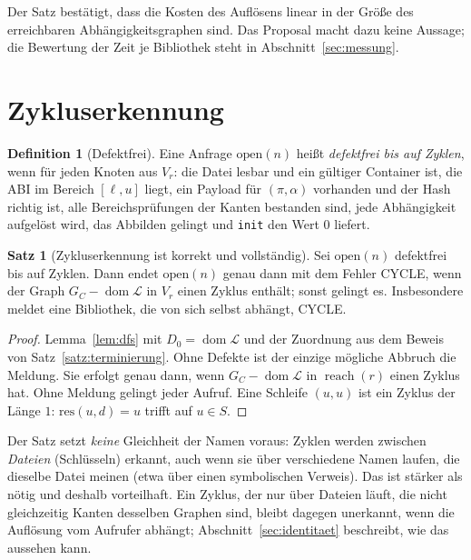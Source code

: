 \documentclass[a4paper,12pt,twoside]{report}
\DeclareRobustCommand{\_}{\ifmmode\mbox{\textunderscore}\else\textunderscore\allowbreak{}\fi}
\theoremstyle{definition}
\newtheorem{definition}{Definition}[chapter]
\newtheorem{satz}{Satz}[chapter]
\newcommand{\dom}{\operatorname{dom}}
\begin{document}
Der Satz bestätigt, dass die Kosten des Auflösens linear in der Größe des erreichbaren Abhängigkeitsgraphen sind. Das Proposal macht dazu keine Aussage; die Bewertung der Zeit je Bibliothek steht in Abschnitt~\ref{sec:messung}.

\section{Zykluserkennung}
\label{sec:zyklus}

\begin{definition}[Defektfrei]
	Eine Anfrage $\mathrm{open}(n)$ heißt \emph{defektfrei bis auf Zyklen}, wenn für jeden Knoten aus $V_r$: die Datei lesbar und ein gültiger Container ist, die ABI im Bereich $[\ell,u]$ liegt, ein Payload für $(\pi,\alpha)$ vorhanden und der Hash richtig ist, alle Bereichsprüfungen der Kanten bestanden sind, jede Abhängigkeit aufgelöst wird, das Abbilden gelingt und \texttt{init} den Wert $0$ liefert.
\end{definition}

\begin{satz}[Zykluserkennung ist korrekt und vollständig]
	\label{satz:zyklus}
	Sei $\mathrm{open}(n)$ defektfrei bis auf Zyklen. Dann endet $\mathrm{open}(n)$ genau dann mit dem Fehler CYCLE, wenn der Graph $G_C-\dom\mathcal L$ in $V_r$ einen Zyklus enthält; sonst gelingt es. Insbesondere meldet eine Bibliothek, die von sich selbst abhängt, CYCLE.
\end{satz}

\begin{proof}
	Lemma~\ref{lem:dfs} mit $D_0=\dom\mathcal L$ und der Zuordnung aus dem Beweis von Satz~\ref{satz:terminierung}. Ohne Defekte ist der einzige mögliche Abbruch die Meldung. Sie erfolgt genau dann, wenn $G_C-\dom\mathcal L$ in $\operatorname{reach}(r)$ einen Zyklus hat. Ohne Meldung gelingt jeder Aufruf. Eine Schleife $(u,u)$ ist ein Zyklus der Länge $1$: $\mathrm{res}(u,d)=u$ trifft auf $u\in S$.
\end{proof}

Der Satz setzt \emph{keine} Gleichheit der Namen voraus: Zyklen werden zwischen \emph{Dateien} (Schlüsseln) erkannt, auch wenn sie über verschiedene Namen laufen, die dieselbe Datei meinen (etwa über einen symbolischen Verweis). Das ist stärker als nötig und deshalb vorteilhaft. Ein Zyklus, der nur über Dateien läuft, die nicht gleichzeitig Kanten desselben Graphen sind, bleibt dagegen unerkannt, wenn die Auflösung vom Aufrufer abhängt; Abschnitt~\ref{sec:identitaet} beschreibt, wie das aussehen kann.
\end{document}
